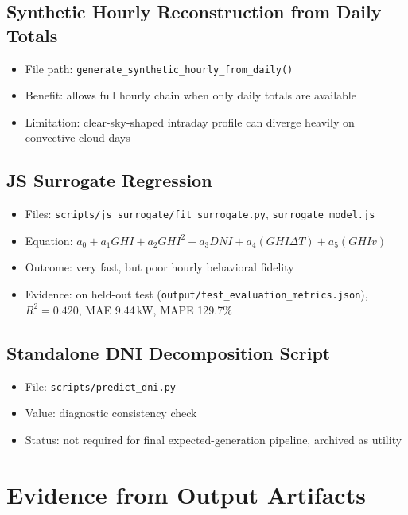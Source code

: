 \documentclass[11pt,a4paper]{article}
\newcommand{\artifact}[1]{\texttt{#1}}
\newcommand{\metric}[1]{\textbf{#1}}
\begin{document}
\subsection{Synthetic Hourly Reconstruction from Daily Totals}
\begin{itemize}
  \item File path: \artifact{generate\_synthetic\_hourly\_from\_daily()}
  \item Benefit: allows full hourly chain when only daily totals are available
  \item Limitation: clear-sky-shaped intraday profile can diverge heavily on convective cloud days
\end{itemize}

\subsection{JS Surrogate Regression}
\begin{itemize}
  \item Files: \artifact{scripts/js\_surrogate/fit\_surrogate.py}, \artifact{surrogate\_model.js}
  \item Equation: $a_0 + a_1GHI + a_2GHI^2 + a_3DNI + a_4(GHI\Delta T)+a_5(GHIv)$
  \item Outcome: very fast, but poor hourly behavioral fidelity
  \item Evidence: on held-out test (\artifact{output/test\_evaluation\_metrics.json}), \metric{$R^2=0.420$}, MAE 9.44\,kW, MAPE 129.7\%
\end{itemize}

\subsection{Standalone DNI Decomposition Script}
\begin{itemize}
  \item File: \artifact{scripts/predict\_dni.py}
  \item Value: diagnostic consistency check
  \item Status: not required for final expected-generation pipeline, archived as utility
\end{itemize}

\section{Evidence from Output Artifacts}
\end{document}
